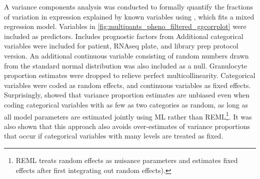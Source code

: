\begin{outline}
\1 A variance components analysis was conducted to formally quantify the fractions of variation in expression explained by known variables
using \autocite{hoffman2016VariancePartitionInterpretingDrivers}, which fits a mixed regression model.
Variables in \autoref{fig:multipants_pheno_filtered_ggcorrplot} were included as predictors.
    \2 Includes prognostic factors from \autocite{kennedy2019PredictorsAntiTNFTreatment}
\1 Additional categorical variables were included for patient, \gls{RNAseq} plate, and library prep protocol version.
An additional continuous variable consisting of random numbers drawn from the standard normal distribution was also included as a null.
Granulocyte proportion estimates were dropped to relieve perfect multicollinearity.
Categorical variables were coded as random effects, and continuous variables as fixed effects.
Surprisingly, \textcite{hoffman2016VariancePartitionInterpretingDrivers} showed that variance proportion estimates are unbiased even when coding categorical variables with as few as two categories as random, 
as long as all model parameters are estimated jointly using \gls{ML} rather than \gls{REML}\footnote{
    \gls{REML} treats random effects as nuisance parameters and estimates fixed effects after first integrating out random effects).
}.
It was also shown that this approach also avoids over-estimates of variance proportions that occur if categorical variables with many levels are treated as fixed.



\end{outline}
